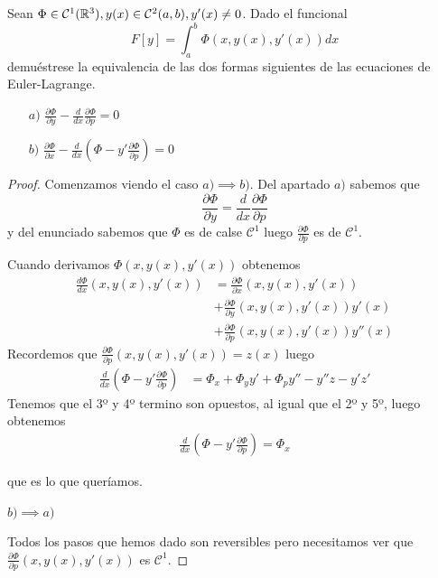 \begin{ejercicio}
  Sean $\Phi\in \mathcal{C}^1(\mathbb{R}^3), y(x)\in \mathcal{C}^2(a,b), y'(x) \neq 0$. Dado el funcional
  \[
    F[y] = \int_{a}^{b}{\Phi(x,y(x),y'(x))dx}
  \]
  demuéstrese la equivalencia de las dos formas siguientes de las
  ecuaciones de Euler-Lagrange.
  \begin{itemize}
  \item[$a)$] $\frac{\partial\Phi}{\partial y}-\frac{d}{dx}\frac{\partial\Phi}{\partial p} = 0 $
  \item[$b)$] $\frac{\partial\Phi}{\partial x} - \frac{d}{dx}(\Phi-y'\frac{\partial\Phi}{\partial p}) = 0$
  \end{itemize}
  \begin{proof}
    Comenzamos viendo el caso $a) \implies b)$. Del apartado $a)$ sabemos que
    \[
      \frac{\partial\Phi}{\partial y} = \frac{d}{dx}\frac{\partial\Phi}{\partial p}
    \]
    y del enunciado sabemos que $\Phi$ es de calse $\mathcal{C}^1$
    luego $\frac{\partial\Phi}{\partial p}$ es de $\mathcal{C}^1$.

    Cuando derivamos $\Phi(x,y(x),y'(x))$ obtenemos
    \begin{align*}
      \frac{d\Phi}{dx}(x,y(x),y'(x)) & = \frac{\partial\Phi}{\partial x}(x, y(x), y'(x)) \\
                          & + \frac{\partial\Phi}{\partial y}(x, y(x), y'(x))y'(x) \\
                          & + \frac{\partial\Phi}{\partial p}(x, y(x), y'(x))y''(x)
    \end{align*}
    Recordemos que $\frac{\partial\Phi}{\partial p}(x, y(x), y'(x)) = z(x)$ luego
    \begin{align*}
      \frac{d}{dx}(\Phi-y'\frac{\partial\Phi}{\partial p}) & = \Phi_x + \Phi_yy' + \Phi_py'' - y''z -y'z'
    \end{align*}
    Tenemos que el 3º y 4º termino son opuestos, al igual que el 2º y 5º, luego obtenemos
        \begin{align*}
      \frac{d}{dx}(\Phi-y'\frac{\partial\Phi}{\partial p}) = \Phi_x
        \end{align*}

        que es lo que queríamos.

        $b)\implies a)$
        
        Todos los pasos que hemos dado son reversibles pero
        necesitamos ver que
        $\frac{\partial\Phi}{\partial p}(x, y(x), y'(x))$ es $\mathcal{C}^1$.


\end{proof}
\end{ejercicio}
